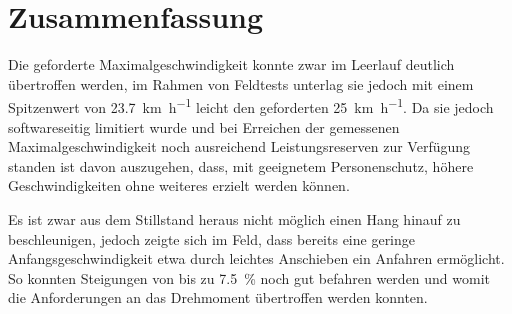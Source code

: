 \chapter{Zusammenfassung}
	Die geforderte Maximalgeschwindigkeit konnte zwar im Leerlauf deutlich übertroffen werden, im Rahmen von Feldtests unterlag sie jedoch mit einem Spitzenwert von \qty{23,7}{\kilo\metre\per\hour} leicht den geforderten \qty{25}{\kilo\metre\per\hour}.
	Da sie jedoch softwareseitig limitiert wurde und bei Erreichen der gemessenen Maximalgeschwindigkeit noch ausreichend Leistungsreserven zur Verfügung standen ist davon auszugehen, dass, mit geeignetem Personenschutz, höhere Geschwindigkeiten ohne weiteres erzielt werden können.

	Es ist zwar aus dem Stillstand heraus nicht möglich einen Hang hinauf zu beschleunigen, jedoch zeigte sich im Feld, dass bereits eine geringe Anfangsgeschwindigkeit etwa durch leichtes Anschieben ein Anfahren ermöglicht.
	So konnten Steigungen von bis zu \qty{7,5}{\percent} noch gut befahren werden und womit die Anforderungen an das Drehmoment übertroffen werden konnten.\par\medskip
	